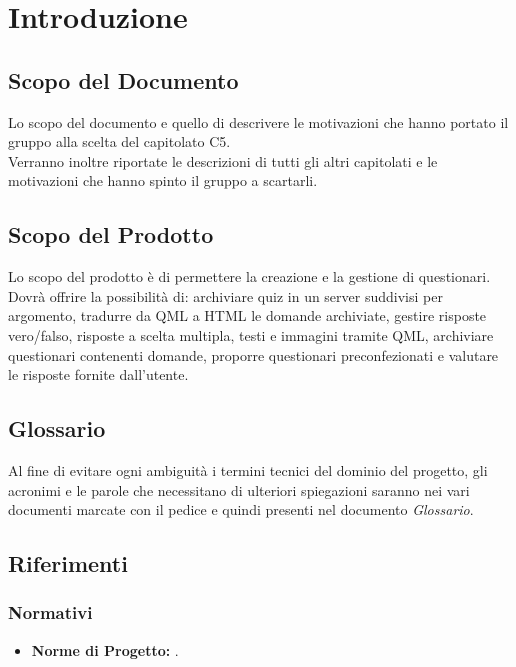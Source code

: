 \section{Introduzione}

\subsection{Scopo del Documento}
Lo scopo del documento e quello di descrivere le motivazioni che hanno portato il gruppo alla scelta del capitolato C5. \\ Verranno inoltre riportate le descrizioni di tutti gli altri capitolati e le motivazioni che hanno spinto il gruppo a scartarli.
 
\subsection{Scopo del Prodotto}
Lo scopo del prodotto è di permettere la creazione e la gestione di questionari. Dovrà offrire la possibilità di: archiviare quiz in un server suddivisi per argomento, tradurre da QML a HTML le domande archiviate, gestire risposte vero/falso, risposte a scelta multipla, testi e immagini tramite QML, archiviare questionari contenenti domande, proporre questionari preconfezionati e valutare le risposte fornite dall'utente.

\subsection{Glossario}
Al fine di evitare ogni ambiguità i termini tecnici del dominio del progetto, gli acronimi e le parole che necessitano di ulteriori spiegazioni saranno nei vari documenti marcate con il pedice  e quindi presenti nel documento \textit{Glossario}.

\subsection{Riferimenti}

\subsubsection{Normativi}
\begin{itemize}
\item \textbf{Norme di Progetto:} \NdP.
\end{itemize}

